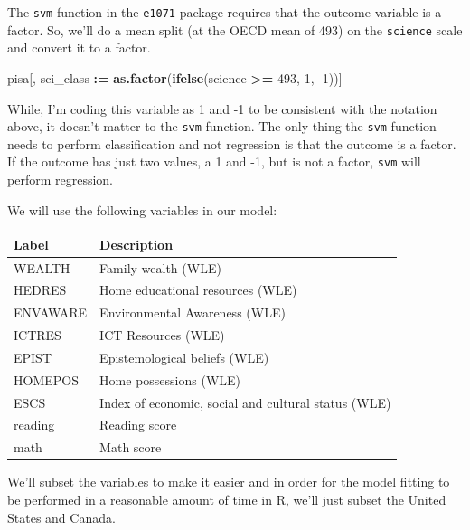 \documentclass[]{book}
\newenvironment{Shaded}{\begin{snugshade}}{\end{snugshade}}
\newcommand{\DataTypeTok}[1]{\textcolor[rgb]{0.13,0.29,0.53}{#1}}
\newcommand{\DecValTok}[1]{\textcolor[rgb]{0.00,0.00,0.81}{#1}}
\newcommand{\ErrorTok}[1]{\textcolor[rgb]{0.64,0.00,0.00}{\textbf{#1}}}
\newcommand{\KeywordTok}[1]{\textcolor[rgb]{0.13,0.29,0.53}{\textbf{#1}}}
\newcommand{\NormalTok}[1]{#1}
\newcommand{\OperatorTok}[1]{\textcolor[rgb]{0.81,0.36,0.00}{\textbf{#1}}}
\newcommand{\StringTok}[1]{\textcolor[rgb]{0.31,0.60,0.02}{#1}}
\begin{document}
The \texttt{svm} function in the \texttt{e1071} package requires that the outcome variable is a factor. So, we'll do a mean split (at the OECD mean of 493) on the \texttt{science} scale and convert it to a factor.

\begin{Shaded}
\begin{Highlighting}[]
\NormalTok{pisa[, sci_class }\OperatorTok{:}\ErrorTok{=}\StringTok{ }\KeywordTok{as.factor}\NormalTok{(}\KeywordTok{ifelse}\NormalTok{(science }\OperatorTok{>=}\StringTok{ }\DecValTok{493}\NormalTok{, }\DecValTok{1}\NormalTok{, }\DecValTok{-1}\NormalTok{))]}
\end{Highlighting}
\end{Shaded}

While, I'm coding this variable as 1 and -1 to be consistent with the notation above, it doesn't matter to the \texttt{svm} function. The only thing the \texttt{svm} function needs to perform classification and not regression is that the outcome is a factor. If the outcome has just two values, a 1 and -1, but is not a factor, \texttt{svm} will perform regression.

We will use the following variables in our model:

\begin{longtable}[]{@{}ll@{}}
\toprule
Label & Description\tabularnewline
\midrule
\endhead
WEALTH & Family wealth (WLE)\tabularnewline
HEDRES & Home educational resources (WLE)\tabularnewline
ENVAWARE & Environmental Awareness (WLE)\tabularnewline
ICTRES & ICT Resources (WLE)\tabularnewline
EPIST & Epistemological beliefs (WLE)\tabularnewline
HOMEPOS & Home possessions (WLE)\tabularnewline
ESCS & Index of economic, social and cultural status (WLE)\tabularnewline
reading & Reading score\tabularnewline
math & Math score\tabularnewline
\bottomrule
\end{longtable}

We'll subset the variables to make it easier and in order for the model fitting to be performed in a reasonable amount of time in R, we'll just subset the United States and Canada.

\begin{Shaded}
\end{Shaded}
\end{document}
